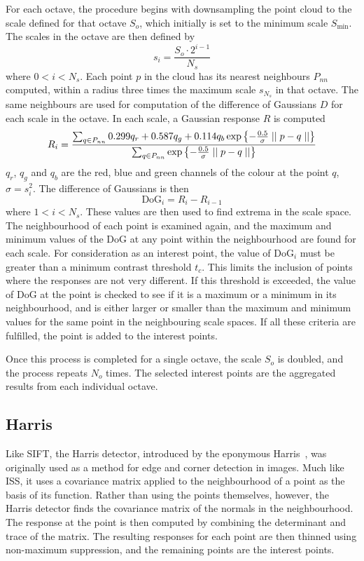 \documentclass[11pt,a4paper]{kth-mag}
\begin{document}
For each octave, the procedure begins with downsampling the point cloud to the
scale defined for that octave $S_{o}$, which initially is set to the minimum
scale $S_{\min}$. The scales in the octave are then defined by
\begin{equation}
  \label{eq:14}
  s_i=\frac{S_o\cdot 2^{i - 1}}{N_s}
\end{equation}
where $0<i<N_s$. Each point $p$ in the cloud has its nearest neighbours $P_{nn}$ computed,
within a radius three times the maximum scale $s_{N_s}$ in that octave. The same
neighbours are used for computation of the difference of Gaussians $D$ for each
scale in the octave. In each scale, a Gaussian response $R$ is computed
\begin{equation}
  \label{eq:15}
  R_i=\frac{\sum_{q\in P_{nn}}0.299q_r + 0.587q_g +
    0.114q_b\exp\left\{-\frac{0.5}{\sigma}\mid\mid p-q\mid\mid\right\}}{\sum_{q\in P_{nn}}\exp\left\{-\frac{0.5}{\sigma}\mid\mid p-q\mid\mid\right\}}\\
\end{equation}
$q_r$, $q_g$ and $q_b$ are the red, blue and green channels of the colour at the
point $q$, $\sigma=s_i^2$. The difference of Gaussians is then
\begin{equation}
  \label{eq:16}
  \text{DoG}_i=R_i-R_{i-1}
\end{equation}
where $1<i<N_s$. These values are then used to find extrema in the scale space.
The neighbourhood of each point is examined again, and the maximum and minimum
values of the DoG at any point within the neighbourhood are found for each
scale. For consideration as an interest point, the value of DoG$_i$ must be
greater than a minimum contrast threshold $t_c$. This limits the inclusion of
points where the responses are not very different. If this threshold is
exceeded, the value of DoG at the point is checked to see if it is a maximum or
a minimum in its neighbourhood, and is either larger or smaller than the maximum
and minimum values for the same point in the neighbouring scale spaces. If all
these criteria are fulfilled, the point is added to the interest points.

Once this process is completed for a single octave, the scale $S_o$ is doubled,
and the process repeats $N_o$ times. The selected interest points are the
aggregated results from each individual octave. 

\subsection{Harris}
Like SIFT, the Harris detector, introduced by the eponymous
Harris~\cite{harris1988combined}, was originally used as a method for edge and
corner detection in images. Much like ISS, it uses a covariance matrix applied
to the neighbourhood of a point as the basis of its function. Rather than using
the points themselves, however, the Harris detector finds the covariance matrix
of the normals in the neighbourhood. The response at the point is then computed
by combining the determinant and trace of the matrix. The resulting responses
for each point are then thinned using non-maximum suppression, and the remaining
points are the interest points.
\end{document}
